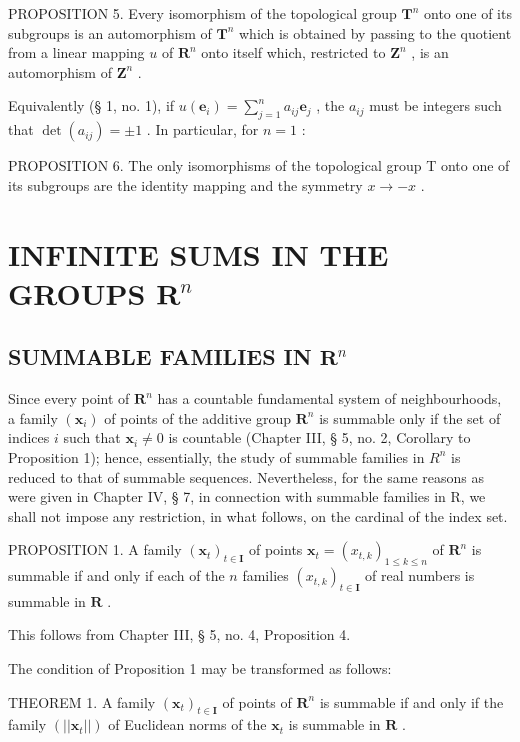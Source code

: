 PROPOSITION 5. Every isomorphism of the topological group \(\mathbf{T}^n\) onto one of its subgroups is an automorphism of \(\mathbf{T}^n\) which is obtained by passing to the quotient from a linear mapping \(u\) of \(\mathbf{R}^n\) onto itself which, restricted to \(\mathbf{Z}^n\) , is an automorphism of \(\mathbf{Z}^n\) .

Equivalently (§ 1, no. 1), if \(u(\boldsymbol{e}_i) = \sum_{j=1}^{n} a_{ij} \boldsymbol{e}_j\) , the \(a_{ij}\) must be integers such that \(\det(a_{ij}) = \pm 1\) . In particular, for \(n = 1\) :

PROPOSITION 6. The only isomorphisms of the topological group T onto one of its subgroups are the identity mapping and the symmetry \(x \to -x\) .

\section{\texorpdfstring{INFINITE SUMS IN THE GROUPS \(\mathbf{R}^n\)}{INFINITE SUMS IN THE GROUPS R TO THE N}}

\subsection{\texorpdfstring{SUMMABLE FAMILIES IN \(\mathbf{R}^n\)}{SUMMABLE FAMILIES IN R TO THE N}}

Since every point of \(\mathbf{R}^n\) has a countable fundamental system of neighbourhoods, a family \((\pmb{x}_i)\) of points of the additive group \(\mathbf{R}^n\) is summable only if the set of indices \(i\) such that \(\mathbf{x}_i \neq 0\) is countable (Chapter III, § 5, no. 2, Corollary to Proposition 1); hence, essentially, the study of summable families in \(R^{n}\) is reduced to that of summable sequences. Nevertheless, for the same reasons as were given in Chapter IV, § 7, in connection with summable families in R, we shall not impose any restriction, in what follows, on the cardinal of the index set.

PROPOSITION 1. A family \((\pmb{x}_t)_{t\in \mathbf{I}}\) of points \(\pmb{x}_t = (x_{t,k})_{1\leq k\leq n}\) of \(\mathbf{R}^n\) is summable if and only if each of the \(n\) families \((x_{t,k})_{t\in \mathbf{I}}\) of real numbers is summable in \(\mathbf{R}\) .

This follows from Chapter III, § 5, no. 4, Proposition 4.

The condition of Proposition 1 may be transformed as follows:

THEOREM 1. A family \((\pmb{x}_t)_{t\in \mathbf{I}}\) of points of \(\mathbf{R}^n\) is summable if and only if the family \((||\pmb{x}_t||)\) of Euclidean norms of the \(\pmb{x}_t\) is summable in \(\mathbf{R}\) .

